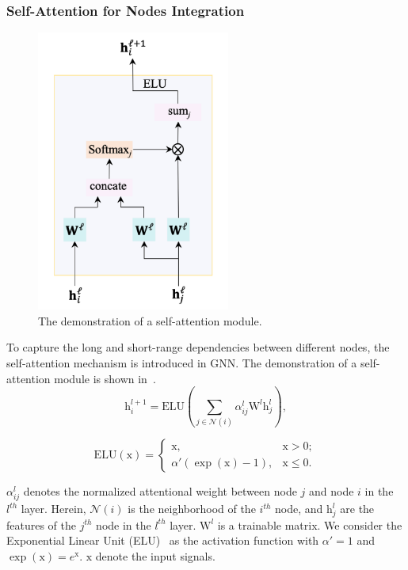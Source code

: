 \subsubsection{Self-Attention for Nodes Integration}
\begin{figure}[!ht]
	\begin{minipage}[t]{\linewidth}
		\centering
		\includegraphics[width=2.5in]{fig/NLNet-Attention.png}
	\end{minipage}
	\caption{The demonstration of a self-attention module.}
	\label{NLNet}
\end{figure}

To capture the long and short-range dependencies between different nodes, the self-attention mechanism is introduced in GNN. The demonstration of a self-attention module is shown in~.
\begin{equation}
	\boldsymbol{\mathrm{h}}_{i}^{l+1}=\mathrm{ELU}\left(\sum\limits_{j\in\mathcal{N}(i)} \alpha_{i j}^{l}\boldsymbol{\mathrm W}^{l} \boldsymbol{\mathrm h}_{j}^{l}\right),
	\label{GAT}
\end{equation}

\begin{equation}
	\mathrm{ELU}(\boldsymbol{\mathrm x})= \begin{cases}\boldsymbol{\mathrm x}, & \boldsymbol{\mathrm x}>0; \\ \alpha'(\exp(\boldsymbol{\mathrm x})-1), & \boldsymbol{\mathrm x} \leqslant 0.\end{cases}
	\label{ELU}
\end{equation}

\indent$\alpha_{i j}^{l}$ denotes the normalized attentional weight between node $j$ and node $i$ in the $l^{th}$ layer. Herein, $\mathcal{N}(i)$ is the neighborhood of the $i^{th}$ node, and $\boldsymbol{\mathrm h}_{j}^{l}$ are the features of the $j^{th}$ node in the $l^{th}$ layer. $\boldsymbol{\mathrm W}^{l}$ is a trainable matrix. We consider the Exponential Linear Unit (ELU)~\citep{clevert2015fast} as the activation function with $\alpha'=1$ and $\exp(\boldsymbol{\mathrm x})=e^{\boldsymbol{\mathrm x}}$. $\boldsymbol{\mathrm x}$ denote the input signals.

